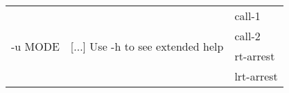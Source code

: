 {\small
\begin{tabular}{@{}p{}p{}l@{}}
\multirow{4}{=}{-u MODE} & \multirow{4}{=}{[...] Use -h to see extended help} & call-1 \\
 &  & call-2 \\
 &  & rt-arrest \\
 &  & lrt-arrest \\
\end{tabular}\\
}
